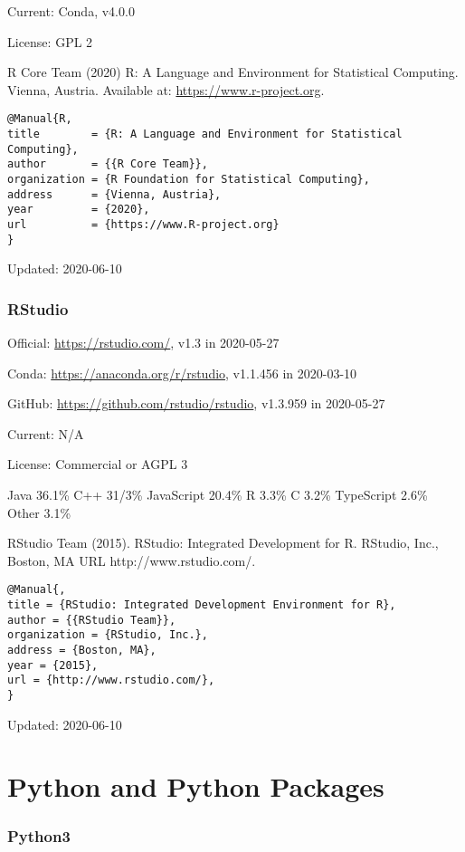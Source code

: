 \documentclass[]{article}
\begin{document}
Current: Conda, v4.0.0

License: GPL 2

R Core Team (2020) R: A Language and Environment for Statistical Computing. Vienna, Austria. Available at: \url{https://www.r-project.org}.

\begin{verbatim}
@Manual{R,
title        = {R: A Language and Environment for Statistical
Computing},
author       = {{R Core Team}},
organization = {R Foundation for Statistical Computing},
address      = {Vienna, Austria},
year         = {2020},
url          = {https://www.R-project.org}
}
\end{verbatim}

Updated: 2020-06-10

\section{RStudio}

Official: \url{https://rstudio.com/}, v1.3 in 2020-05-27

Conda: \url{https://anaconda.org/r/rstudio}, v1.1.456 in 2020-03-10

GitHub: \url{https://github.com/rstudio/rstudio}, v1.3.959 in 2020-05-27

Current: N/A

License: Commercial or AGPL 3

Java 36.1\% C++ 31/3\% JavaScript 20.4\% R 3.3\% C 3.2\% TypeScript 2.6\% Other 3.1\% 

RStudio Team (2015). RStudio: Integrated Development for R. RStudio, Inc., Boston, MA URL http://www.rstudio.com/.

\begin{verbatim}
@Manual{,
title = {RStudio: Integrated Development Environment for R},
author = {{RStudio Team}},
organization = {RStudio, Inc.},
address = {Boston, MA},
year = {2015},
url = {http://www.rstudio.com/},
}
\end{verbatim}

Updated: 2020-06-10

\part{Python and Python Packages}

\section{Python3}
\end{document}
